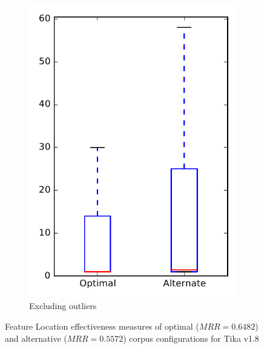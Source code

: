 \begin{figure}
\begin{subfigure}{.4\textwidth}
        \includegraphics[height=0.4\textheight]{figures/combo/flt_rq2_tika_no_outlier}
        \caption{Excluding outliers}\label{fig:combo:flt:rq2:tika_no_outlier}
    \end{subfigure}
\caption{Feature Location effectiveness measures of optimal ($MRR=0.6482$) and alternative ($MRR=0.5572$) corpus configurations for Tika v1.8}
\label{fig:combo:flt:rq2:tika}
\end{figure}
